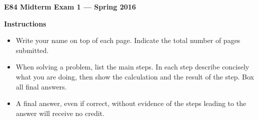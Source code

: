 \usepackage{html}


\begin{center}
{\Large \bf  E84 Midterm Exam 1 --- Spring 2016}
\end{center}

{\bf Instructions}
\begin{itemize}
\item Write your name on top of each page. Indicate the total number of 
  pages submitted.
\item When solving a problem, list the main steps. In each step describe 
  concisely what you are doing, then show the calculation and the 
  result of the step. Box all final answers. 
\item A final answer, even if correct, without evidence of the steps 
  leading to the answer will receive no credit. 
\end{itemize}

\newpage

